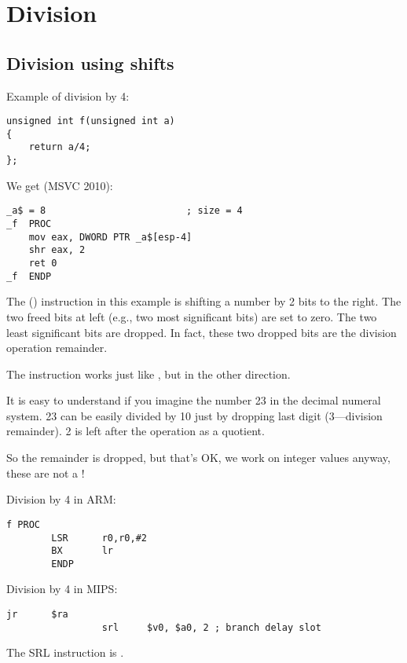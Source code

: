 \section{Division}

\subsection{Division using shifts}
\label{division_by_shifting}

Example of division by 4:

\begin{lstlisting}
unsigned int f(unsigned int a)
{
	return a/4;
};
\end{lstlisting}

We get (MSVC 2010):

\begin{lstlisting}[caption=MSVC 2010]
_a$ = 8							; size = 4
_f	PROC
	mov	eax, DWORD PTR _a$[esp-4]
	shr	eax, 2
	ret	0
_f	ENDP
\end{lstlisting}

\label{SHR}

The \SHR () instruction in this example is shifting a number by 2 bits to the right.
The two freed bits at left (e.g., two most significant bits) are set to zero.
The two least significant bits are dropped.
In fact, these two dropped bits are the division operation remainder.


The \SHR instruction works just like \SHL, but in the other direction.



It is easy to understand if you imagine the number 23 in the decimal numeral system.
23 can be easily divided by 10 just by dropping last digit (3---division remainder). 
2 is left after the operation as a \gls{quotient}.

So the remainder is dropped, but that's OK, we work on integer values anyway, 
these are not a !

\ifdefined\IncludeARM
Division by 4 in ARM:

\begin{lstlisting}[caption=\NonOptimizingKeilVI (\ARMMode)]
f PROC
        LSR      r0,r0,#2
        BX       lr
        ENDP
\end{lstlisting}
\fi

\ifdefined\IncludeMIPS
Division by 4 in MIPS:

\begin{lstlisting}[caption=\Optimizing GCC 4.4.5 (IDA)]
                 jr      $ra
                 srl     $v0, $a0, 2 ; branch delay slot
\end{lstlisting}

The SRL instruction is .
\fi
